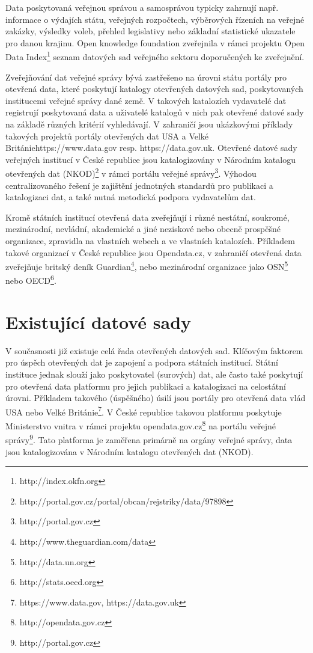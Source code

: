 Data poskytovaná veřejnou správou a samosprávou typicky zahrnují např. informace o výdajích státu, veřejných rozpočtech, výběrových řízeních na veřejné zakázky, výsledky voleb, přehled legislativy nebo základní statistické ukazatele pro danou krajinu. Open knowledge foundation zveřejnila v rámci projektu Open Data Index\footnote{http://index.okfn.org} seznam datových sad veřejného sektoru doporučených ke zveřejnění.

Zveřejňování dat veřejné správy bývá zastřešeno na úrovni státu portály pro otevřená data, které poskytují katalogy otevřených datových sad, poskytovaných institucemi veřejné správy dané země. V takových katalozích vydavatelé dat registrují poskytovaná data a uživatelé katalogů v nich pak otevřené datové sady na základě různých kritérií vyhledávají. V zahraničí jsou ukázkovými příklady takových projektů portály otevřených dat USA a Velké Británie{https://www.data.gov resp. https://data.gov.uk}. Otevřené datové sady veřejných institucí v České republice jsou katalogizovány v Národním katalogu otevřených dat (NKOD)\footnote{http://portal.gov.cz/portal/obcan/rejstriky/data/97898} v rámci portálu veřejné správy\footnote{http://portal.gov.cz}. Výhodou centralizovaného řešení je zajištění jednotných standardů pro publikaci a katalogizaci dat, a také nutná metodická podpora vydavatelům dat.

Kromě státních institucí otevřená data zveřejňují i různé nestátní, soukromé, mezinárodní, nevládní, akademické a jiné neziskové nebo obecně prospěšné organizace, zpravidla na vlastních webech a ve vlastních katalozích. Příkladem takové organizací v České republice jsou Opendata.cz, v zahraničí otevřená data zveřejňuje britský deník Guardian\footnote{http://www.theguardian.com/data}, nebo mezinárodní organizace jako OSN\footnote{http://data.un.org} nebo OECD\footnote{http://stats.oecd.org}.

\section{Existující datové sady}

V současnosti již existuje celá řada otevřených datových sad. Klíčovým faktorem pro úspěch otevřených dat je zapojení a podpora státních institucí. Státní instituce jednak slouží jako poskytovatel (surových) dat, ale často také poskytují pro otevřená data platformu pro jejich publikaci a katalogizaci na celostátní úrovni. Příkladem takového (úspěšného) úsilí jsou portály pro otevřená data vlád USA nebo Velké Británie\footnote{https://www.data.gov, https://data.gov.uk}. V České republice takovou platformu poskytuje Ministerstvo vnitra v rámci projektu opendata.gov.cz\footnote{http://opendata.gov.cz} na portálu veřejné správy\footnote{http://portal.gov.cz}. Tato platforma je zaměřena primárně na orgány veřejné správy, data jsou katalogizována v Národním katalogu otevřených dat (NKOD).

